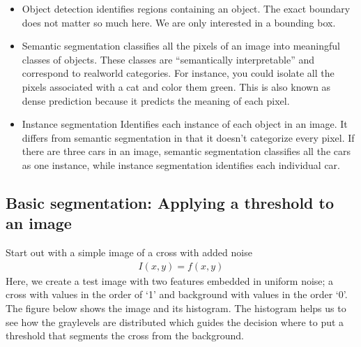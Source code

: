 \documentclass[letterpaper,10pt,english]{sphinxmanual}
\begin{document}
\begin{itemize}
\item {} 
Object detection \sphinxhyphen{} identifies regions containing an object. The exact boundary does not matter so much here. We are only interested in a bounding box.

\item {} 
Semantic segmentation \sphinxhyphen{} classifies all the pixels of an image into meaningful classes of objects. These classes are “semantically interpretable” and correspond to real\sphinxhyphen{}world categories. For instance, you could isolate all the pixels associated with a cat and color them green. This is also known as dense prediction because it predicts the meaning of each pixel.

\item {} 
Instance segmentation \sphinxhyphen{} Identifies each instance of each object in an image. It differs from semantic segmentation in that it doesn’t categorize every pixel. If there are three cars in an image, semantic segmentation classifies all the cars as one instance, while instance segmentation identifies each individual car.

\end{itemize}


\subsection{Basic segmentation: Applying a threshold to an image}
\label{\detokenize{ML4NeutronImageSegmentation:basic-segmentation-applying-a-threshold-to-an-image}}
Start out with a simple image of a cross with added noise
\begin{equation*}
\begin{split} I(x,y) = f(x,y) \end{split}
\end{equation*}
Here, we create a test image with two features embedded in uniform noise; a cross with values in the order of ‘1’ and background with values in the order ‘0’. The figure below shows the image and its histogram. The histogram helps us to see how the graylevels are distributed which guides the decision where to put a threshold that segments the cross from the background.
\end{document}

